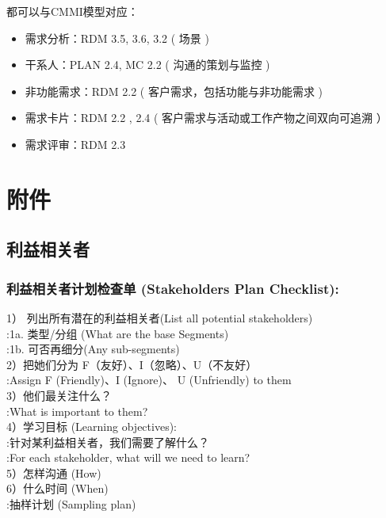 都可以与CMMI模型对应：

\begin{itemize}
\tightlist
\item
  需求分析：RDM 3.5, 3.6, 3.2 ( 场景 )
\item
  干系人：PLAN 2.4, MC 2.2 ( 沟通的策划与监控 )
\item
  非功能需求：RDM 2.2 ( 客户需求，包括功能与非功能需求 )
\item
  需求卡片：RDM 2.2 , 2.4 ( 客户需求与活动或工作产物之间双向可追溯 ）
\item
  需求评审：RDM 2.3
\end{itemize}

\hypertarget{ux9644ux4ef6}{%
\section{附件}\label{ux9644ux4ef6}}

\hypertarget{ux5229ux76caux76f8ux5173ux8005}{%
\subsection{利益相关者}\label{ux5229ux76caux76f8ux5173ux8005}}

\hypertarget{ux5229ux76caux76f8ux5173ux8005ux8ba1ux5212ux68c0ux67e5ux5355-stakeholders-plan-checklist}{%
\subsubsection{利益相关者计划检查单 (Stakeholders Plan
Checklist):}\label{ux5229ux76caux76f8ux5173ux8005ux8ba1ux5212ux68c0ux67e5ux5355-stakeholders-plan-checklist}}

1） 列出所有潜在的利益相关者(List all potential stakeholders)\\
:1a. 类型/分组 (What are the base Segments)\\
:1b. 可否再细分(Any sub-segments)\\
2）把她们分为 F（友好）、I（忽略）、U（不友好）\\
:Assign F (Friendly)、I (Ignore)、 U (Unfriendly) to them\\
3）他们最关注什么？\\
:What is important to them?\\
4）学习目标 (Learning objectives):\\
:针对某利益相关者，我们需要了解什么？\\
:For each stakeholder, what will we need to learn?\\
5）怎样沟通 (How)\\
6）什么时间 (When)\\
:抽样计划 (Sampling plan)

